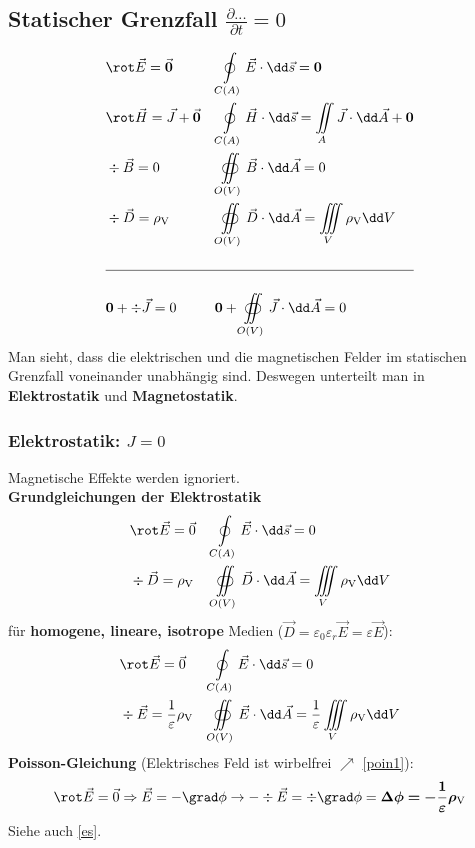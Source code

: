   \subsection{Statischer Grenzfall $\frac{\partial ...}{\partial t}= 0$}
	  \begin{align}
		   & \rot \vec{E}={\vec{\bm{0}}}          &  & \oint\limits_{C(A)}\vec{E}\cdot \dd\vec{s}={\bm{0}}                                          \\
		   & \rot \vec{H}= \vec{J}+{\vec{\bm{0}}} &  & \oint\limits_{C(A)}\vec{H}\cdot \dd\vec{s}= \iint\limits_{A}\vec{J}\cdot \dd\vec{A}+{\bm{0}} \\
		   & \div \vec{B}= 0                      &  & \oiint\limits_{O(V)}\vec{B}\cdot \dd\vec{A}= 0                                               \\
		   & \div \vec{D}= \rho_{\text{V}}        &  & \oiint\limits_{O(V)}\vec{D}\cdot \dd\vec{A}= \iiint\limits_{V}\rho_{\text{V}}\dd V           \\\nonumber
		  \\
		  \hline
		  \nonumber\\
		   & {\bm{0}}+ \div \vec{J}= 0            &  & {\bm{0}}+ \oiint\limits_{O(V)}\vec{J}\cdot \dd\vec{A}= 0
	  \end{align}
	  Man sieht, dass die elektrischen und die magnetischen Felder im statischen Grenzfall voneinander unabhängig sind. Deswegen unterteilt man in \textbf{Elektrostatik} und \textbf{Magnetostatik}.
	  \subsubsection{Elektrostatik: $J = 0$ }
	  Magnetische Effekte werden ignoriert.\\
		  \textbf{Grundgleichungen der Elektrostatik}
		  \begin{align}
			   & \rot \vec{E}= \vec{0}         &  & \oint\limits_{C(A)}\vec{E}\cdot \dd\vec{s}= 0  \label{GGes1}                                    \\
			   & \div \vec{D}= \rho_{\text{V}} &  & \oiint\limits_{O(V)}\vec{D}\cdot \dd\vec{A}= \iiint\limits_{V}\rho_{\text{V}}\dd V \label{GGes2}
		  \end{align}
		  für \textbf{homogene, lineare, isotrope} Medien ($\vec{D}=\varepsilon_{0}\varepsilon
			  _{r} \vec{E}=\varepsilon \vec{E}$):
		  \begin{align}
			   & \rot \vec{E}= \vec{0}                              &  & \oint\limits_{C(A)}\vec{E}\cdot \dd\vec{s}= 0                                                           \\
			   & \div \vec{E}= \frac{1}{\varepsilon}\rho_{\text{V}} &  & \oiint\limits_{O(V)}\vec{E}\cdot \dd\vec{A}= \frac{1}{\varepsilon}\iiint\limits_{V}\rho_{\text{V}}\dd V
		  \end{align}
		  \textbf{Poisson-Gleichung} (Elektrisches Feld ist wirbelfrei $\nearrow$ \ref{poin1}):
		  \begin{equation}
		  	 \rot \vec{E}= \vec{0}\Rightarrow \vec{E}= -\grad \phi \to -\div \vec{E}= \div
		  	\grad \phi = \bm{\Delta\phi = - \frac{1}{\varepsilon}\rho_\text{V}}
		  \end{equation}
		  Siehe auch \ref{es}.
